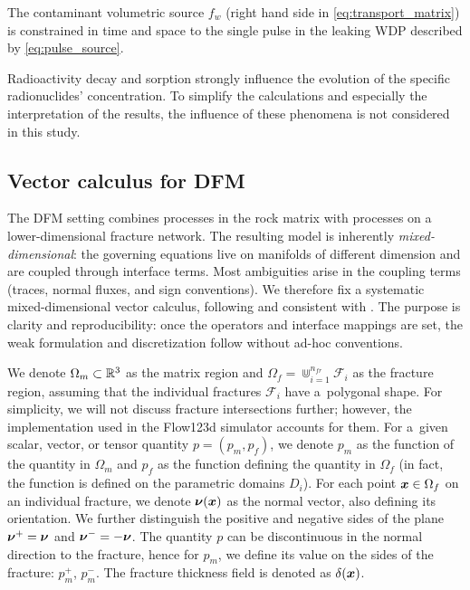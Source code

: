 The contaminant volumetric source $f_w$ (right hand side in
\eqref{eq:transport_matrix}) is constrained in time and space to the single
pulse in the leaking  \gls{WDP} described by  \eqref{eq:pulse_source}.

Radioactivity decay and sorption strongly influence the evolution of the
specific radionuclides' concentration. To simplify the calculations and
especially the interpretation of the results, the influence of these phenomena
is not considered in this study.

\subsection{Vector calculus for DFM}
\label{sec:vek_pocet_dfm}
The DFM setting combines processes in the rock matrix with processes on a
lower-dimensional fracture network. The resulting model is inherently
\emph{mixed-dimensional}: the governing equations live on manifolds of different
dimension and are coupled through interface terms. Most ambiguities arise in
the coupling terms (traces, normal fluxes, and sign conventions). We therefore
fix a systematic mixed-dimensional vector calculus,
following \cite{BrezinaMethodology2023} and consistent with \cite{flow123d}.
The purpose is clarity and reproducibility: once the operators and interface
mappings are set, the weak formulation and discretization follow without ad-hoc
conventions.

We denote $\Omega_m \subset \mathbb R^3$ as the matrix region and
$\Omega_f=\Cup_{i=1}^{n_{fr}}\mathcal F_i$ as the fracture region, assuming
that the individual fractures $\mathcal F_i$ have a~polygonal shape.
For simplicity, we will not discuss fracture intersections further; however,
the implementation used in the Flow123d simulator accounts for them. For
a~given scalar, vector, or tensor quantity $p=(p_m, p_f)$, we denote $p_m$ as
the function of the quantity in $\Omega_m$ and $p_f$ as the function defining
the quantity in $\Omega_f$ (in fact, the function is defined on the parametric
domains $D_i$). For each point ${\bm{x}} \in \Omega_f$ on an individual fracture,
we denote ${\bm{\nu}}({\bm{x}})$ as the normal vector, also defining its orientation. We
further distinguish the positive and negative sides of the plane
${\bm{\nu}}^+ = {\bm{\nu}}$ and ${\bm{\nu}}^-=-{\bm{\nu}}$. The quantity $p$ can be discontinuous in
the normal direction to the fracture, hence for $p_m$, we define its value on
the sides of the fracture: $p_m^+$, $p_m^-$. The fracture thickness field is
denoted as $\delta({\bm{x}})$.

